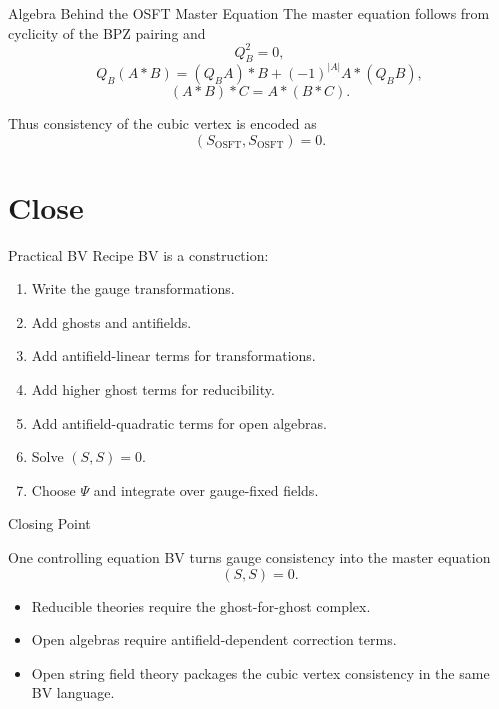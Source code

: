 \documentclass[aspectratio=169,professionalfonts]{beamer}
\begin{document}
\begin{frame}{Algebra Behind the OSFT Master Equation}
  The master equation follows from cyclicity of the BPZ pairing and
  \[
    Q_B^2=0,
  \]
  \[
    Q_B(A*B)=(Q_BA)*B+(-1)^{|A|}A*(Q_BB),
  \]
  \[
    (A*B)*C=A*(B*C).
  \]

  Thus consistency of the cubic vertex is encoded as
  \[
    (S_{\mathrm{OSFT}},S_{\mathrm{OSFT}})=0 .
  \]
\end{frame}

\section{Close}

\begin{frame}{Practical BV Recipe}
  BV is a construction:
  \begin{enumerate}
    \item Write the gauge transformations.
    \item Add ghosts and antifields.
    \item Add antifield-linear terms for transformations.
    \item Add higher ghost terms for reducibility.
    \item Add antifield-quadratic terms for open algebras.
    \item Solve $(S,S)=0$.
    \item Choose $\Psi$ and integrate over gauge-fixed fields.
  \end{enumerate}
\end{frame}

\begin{frame}{Closing Point}
  \begin{alertblock}{One controlling equation}
    BV turns gauge consistency into the master equation
    \[
      (S,S)=0 .
    \]
  \end{alertblock}

  \begin{itemize}
    \item Reducible theories require the ghost-for-ghost complex.
    \item Open algebras require antifield-dependent correction terms.
    \item Open string field theory packages the cubic vertex consistency in
      the same BV language.
  \end{itemize}
\end{frame}

\appendix
\end{document}
